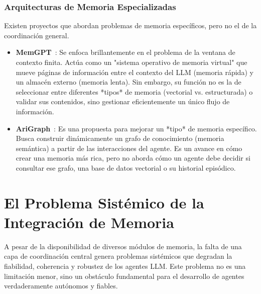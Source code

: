 \documentclass[journal,onecolumn]{IEEEtran}
\begin{document}
\subsubsection{Arquitecturas de Memoria Especializadas}
Existen proyectos que abordan problemas de memoria específicos, pero no el de la coordinación general.
\begin{itemize}
    \item \textbf{MemGPT}~\cite{packer2023memgpt}: Se enfoca brillantemente en el problema de la ventana de contexto finita. Actúa como un "sistema operativo de memoria virtual" que mueve páginas de información entre el contexto del LLM (memoria rápida) y un almacén externo (memoria lenta). Sin embargo, su función no es la de seleccionar entre diferentes *tipos* de memoria (vectorial vs. estructurada) o validar sus contenidos, sino gestionar eficientemente un único flujo de información.
    \item \textbf{AriGraph}~\cite{anokhin2024arigraph}: Es una propuesta para mejorar un *tipo* de memoria específico. Busca construir dinámicamente un grafo de conocimiento (memoria semántica) a partir de las interacciones del agente. Es un avance en cómo crear una memoria más rica, pero no aborda cómo un agente debe decidir si consultar ese grafo, una base de datos vectorial o su historial episódico.
\end{itemize}

\section{El Problema Sistémico de la Integración de Memoria}

A pesar de la disponibilidad de diversos módulos de memoria, la falta de una capa de coordinación central genera problemas sistémicos que degradan la fiabilidad, coherencia y robustez de los agentes LLM. Este problema no es una limitación menor, sino un obstáculo fundamental para el desarrollo de agentes verdaderamente autónomos y fiables.
\end{document}

